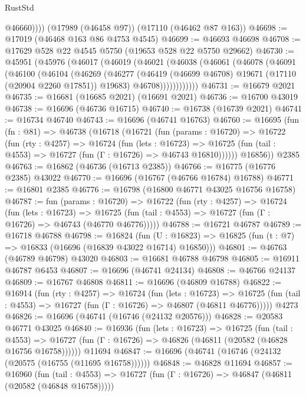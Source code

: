 \begin{lexlean}{RustStd}
\begin{coremodule}
            @46660))))
    (@17989 (@46458 @97))
    (@17110 (@46462 @87 @163))
@46698 := @17019 (@46468 @163 @86 @4753 @4545)
@46699 := @46693 @46698
@46708 := @17629 @528 @22 @4545 @5750 (@19653 @528 @22 @5750 @29662)
@46730 := @45951
    (@45976
      (@46017
        (@46019
          (@46021
            (@46038
              (@46061
                (@46078
                  (@46091
                    (@46100
                      (@46104
                        (@46269
                          (@46277
                            (@46419 (@46699 @46708) @19671 (@17110 (@20904 @2260 @17851)) @19683)
                            @46708))))))))))))
@46731 := @16679 @2021
@46735 := @16681 (@16685 @2021) (@16691 @2021)
@46736 := @16700 @43019
@46738 := @16696 (@46736 @16715)
@46740 := @16738 (@16739 @2021)
@46741 := @16734 @46740
@46743 := @16696 (@46741 @16763)
@46760 := @16695
    (fun (fn : @81) =>
    @46738
      (@16718
        (@16721
          (fun (params : @16720) =>
          @16722
            (fun (rty : @4257) =>
            @16724
              (fun (lets : @16723) =>
              @16725 (fun (tail : @4553) => @16727 (fun (Γ : @16726) => @46743 @16810))))))
        @16856))
    @2385
@46763 := @16862 (@46736 (@16713 @2385))
@46766 := @16775 (@16776 @2385) @43022
@46770 := @16696 (@16767 (@46766 @16784) @16788)
@46771 := @16801 @2385
@46776 := @16798 (@16800 @46771 @43025 @16756 @16758)
@46787 := fun (params : @16720) =>
  @16722
    (fun (rty : @4257) =>
    @16724
      (fun (lets : @16723) =>
      @16725 (fun (tail : @4553) => @16727 (fun (Γ : @16726) => @46743 (@46770 @46776)))))
@46788 := @16721 @46787
@46789 := @16718 @46788
@46798 := @16824
    (fun (U : @16823) => @16825 (fun (t : @7) => @16833 (@16696 (@16839 @43022 @16714) @16850)))
@46801 := @46763 (@46789 @46798) @43020
@46803 := @16681 @46788 @46798
@46805 := @16911 @46787 @6453
@46807 := @16696 (@46741 @24134)
@46808 := @46766 @24137
@46809 := @16767 @46808
@46811 := @16696 (@46809 @16788)
@46822 := @16914
    (fun (rty : @4257) =>
    @16724
      (fun (lets : @16723) =>
      @16725 (fun (tail : @4553) => @16727 (fun (Γ : @16726) => @46807 (@46811 @46776)))))
    @4273
@46826 := @16696 (@46741 (@16746 (@24132 @20576)))
@46828 := @20583 @46771 @43025
@46840 := @16936
    (fun (lets : @16723) =>
    @16725
      (fun (tail : @4553) =>
      @16727 (fun (Γ : @16726) => @46826 (@46811 (@20582 (@46828 @16756 @16758))))))
    @11694
@46847 := @16696 (@46741 (@16746 (@24132 (@20575 (@16755 (@11695 @16758))))))
@46848 := @46828 @11694
@46857 := @16960
    (fun (tail : @4553) => @16727 (fun (Γ : @16726) => @46847 (@46811 (@20582 (@46848 @16758)))))

\end{coremodule}
\end{lexlean}
